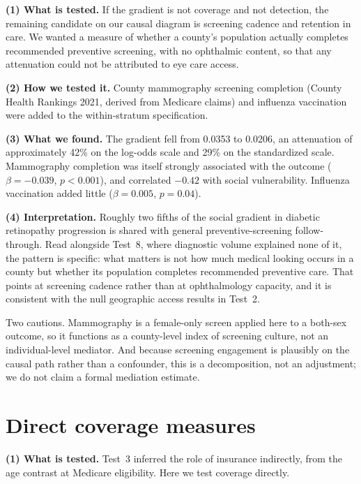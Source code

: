 \documentclass[11pt]{article}
\newcommand{\tpart}[1]{\medskip\noindent\textbf{#1}\quad}
\begin{document}
\tpart{(1) What is tested.} If the gradient is not coverage and not detection,
the remaining candidate on our causal diagram is screening cadence and retention
in care. We wanted a measure of whether a county's population actually completes
recommended preventive screening, with no ophthalmic content, so that any
attenuation could not be attributed to eye care access.

\tpart{(2) How we tested it.} County mammography screening completion (County
Health Rankings 2021, derived from Medicare claims) and influenza vaccination
were added to the within-stratum specification.

\tpart{(3) What we found.} The gradient fell from 0.0353 to 0.0206, an
attenuation of approximately 42\% on the log-odds scale and 29\% on the
standardized scale. Mammography completion was itself strongly associated with
the outcome ($\beta = -0.039$, $p<0.001$), and correlated $-0.42$ with social
vulnerability. Influenza vaccination added little ($\beta = 0.005$,
$p = 0.04$).

\tpart{(4) Interpretation.} Roughly two fifths of the social gradient in
diabetic retinopathy progression is shared with general preventive-screening
follow-through. Read alongside Test~8, where diagnostic volume explained none of
it, the pattern is specific: what matters is not how much medical looking occurs
in a county but whether its population completes recommended preventive care.
That points at screening cadence rather than at ophthalmology capacity, and it
is consistent with the null geographic access results in Test~2.

Two cautions. Mammography is a female-only screen applied here to a both-sex
outcome, so it functions as a county-level index of screening culture, not an
individual-level mediator. And because screening engagement is plausibly on the
causal path rather than a confounder, this is a decomposition, not an adjustment;
we do not claim a formal mediation estimate.

\section{Direct coverage measures}

\tpart{(1) What is tested.} Test~3 inferred the role of insurance indirectly,
from the age contrast at Medicare eligibility. Here we test coverage directly.
\end{document}

